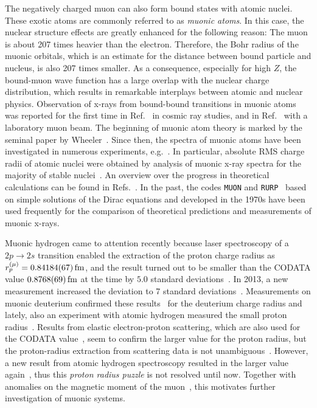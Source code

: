 The negatively charged muon can also form bound states with atomic nuclei. These exotic atoms are commonly referred to as \textit{muonic atoms}. In this case, the nuclear structure effects are greatly enhanced for the following reason: The muon is about 207 times heavier than the electron. Therefore, the Bohr radius of the muonic orbitals, which is an estimate for the distance between bound particle and nucleus, is also 207 times smaller. As a consequence, especially for high $Z$, the bound-muon wave function has a large overlap with the nuclear charge distribution, which results in remarkable interplays between atomic and nuclear physics. Observation of x-rays from bound-bound transitions in muonic atoms was reported for the first time in Ref.~\cite{chang1949} in cosmic ray studies, and in Ref.~\cite{fitch1953} with a laboratory muon beam. The beginning of muonic atom theory is marked by the seminal paper by Wheeler~\cite{wheeler1949}.  Since then, the spectra of muonic atoms have been investigated in numerous experiments, e.g.~\cite{hitlin1970,zehnder1975,powers1976,Yamazaki1978,tanaka1983,tanaka1984,tanaka1984_2,Bergem1988,
powers1977}. In particular, absolute RMS charge radii of atomic nuclei were obtained by analysis of muonic x-ray spectra for the majority of stable nuclei~\cite{FRICKE1995}. An overview over the progress in theoretical calculations can be found in Refs.~\cite{BorieRinker1982,Devons1995,wu1969}. In the past, the codes \texttt{MUON} and \texttt{RURP}~\cite{rinker1979} based on simple solutions of the Dirac equations and developed in the 1970s have been used frequently for the comparison of theoretical predictions and measurements of muonic x-rays. 

Muonic hydrogen came to attention recently because laser spectroscopy of a \mbox{\small{$2p\rightarrow 2s$}} transition enabled the extraction of the proton charge radius as $r_p^{(\mu)}=0.84184(67)\,\rm{fm}$, and the result turned out to be smaller than the CODATA value $0.8768(69)\,\rm{fm}$ at the time by $5.0$ standard deviations~\cite{Pohl2010}. In 2013, a new measurement increased the deviation to 7 standard deviations~\cite{antognini2013}. Measurements on muonic deuterium confirmed these results~\cite{pohl2016} for the deuterium charge radius and lately, also an experiment with atomic hydrogen measured the small proton radius~\cite{beyer2017}.
Results from elastic electron-proton scattering, which are also used for the CODATA value~\cite{codata}, seem to confirm the larger value for the proton radius, but the proton-radius extraction from scattering data is not unambiguous~\cite{arrington2015}. However, a new result from atomic hydrogen spectroscopy resulted in the larger value again~\cite{fleurbaey2018}, thus this \textit{proton radius puzzle} is not resolved until now. Together with anomalies on the magnetic moment of the muon~\cite{bennett2006}, this motivates further investigation of muonic systems.

